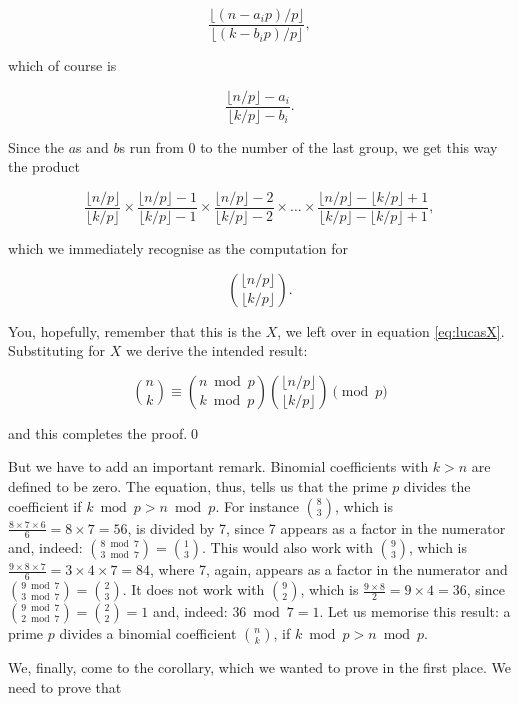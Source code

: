 \documentclass[tikz]{scrreprt}
\begin{document}
\[
\frac{\lfloor (n-a_ip)/p\rfloor}{\lfloor (k-b_ip)/p\rfloor},
\]

which of course is

\[
\frac{\lfloor n/p\rfloor - a_i}{\lfloor k/p\rfloor - b_i}.
\]

Since the $a$s and $b$s run from 0 to the number of the last group,
we get this way the product

\[
\frac{\lfloor n/p\rfloor}{\lfloor k/p\rfloor} \times
\frac{\lfloor n/p\rfloor - 1}{\lfloor k/p\rfloor - 1} \times
\frac{\lfloor n/p\rfloor - 2}{\lfloor k/p\rfloor - 2} \times \dots \times
\frac{\lfloor n/p\rfloor - \lfloor k/p\rfloor + 1}
     {\lfloor k/p\rfloor - \lfloor k/p\rfloor + 1}, 
\]

which we immediately recognise as the computation for 

\[
\binom{\lfloor n/p\rfloor}
      {\lfloor k/p\rfloor}.
\]

You, hopefully, remember that this 
is the $X$, we left over in equation \ref{eq:lucasX}.
Substituting for $X$ we derive the intended result:

\begin{equation}
\binom{n}{k} \equiv \binom{n \bmod p}{k \bmod p} 
                    \binom{\lfloor n/p\rfloor}
                          {\lfloor k/p\rfloor}\pmod{p}
\end{equation}

and this completes the proof.\qed

But we have to add an important remark.
Binomial coefficients with $k > n$
are defined to be zero.
The equation, thus, tells us that
the prime $p$ divides the coefficient
if $k \bmod p > n \bmod p$.
For instance $\binom{8}{3}$, which is 
$\frac{8\times 7 \times 6}{6} = 8 \times 7 = 56$,
is divided by 7, since 7 appears as a factor
in the numerator and, indeed:
$\binom{8 \bmod 7}{3 \bmod 7} = \binom{1}{3}$.
This would also work with $\binom{9}{3}$,
which is $\frac{9\times 8 \times 7}{6} = 3 \times 4 \times 7 = 84$,
where 7, again, appears as a factor in the numerator
and $\binom{9 \bmod 7}{3 \bmod 7} = \binom{2}{3}$.
It does not work with $\binom{9}{2}$,
which is $\frac{9\times 8}{2} = 9 \times 4 = 36$,
since $\binom{9 \bmod 7}{2 \bmod 7} = \binom{2}{2} = 1$ and,
indeed: $36 \bmod 7 = 1$.
Let us memorise this result:
a prime $p$ divides a binomial coefficient $\binom{n}{k}$,
if $k \bmod p > n \bmod p$.

We, finally, come to the corollary,
which we wanted to prove in the first place.
We need to prove that
\end{document}
